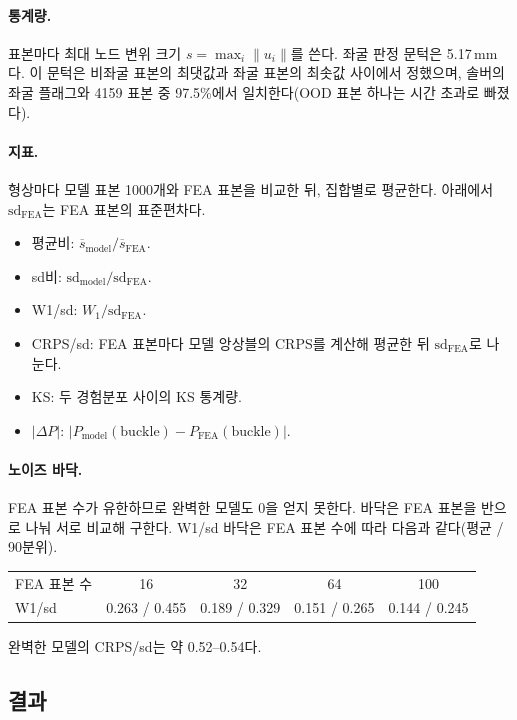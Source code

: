 \documentclass[11pt]{article}
\begin{document}
\paragraph{통계량.} 표본마다 최대 노드 변위 크기 $s=\max_i\|u_i\|$를 쓴다.
좌굴 판정 문턱은 5.17\,mm다. 이 문턱은 비좌굴 표본의 최댓값과 좌굴 표본의
최솟값 사이에서 정했으며, 솔버의 좌굴 플래그와 4159 표본 중 97.5\%에서
일치한다(OOD 표본 하나는 시간 초과로 빠졌다).

\paragraph{지표.} 형상마다 모델 표본 1000개와 FEA 표본을 비교한 뒤, 집합별로
평균한다. 아래에서 $\mathrm{sd}_{\text{FEA}}$는 FEA 표본의 표준편차다.
\begin{itemize}
\item 평균비: $\overline{s}_{\text{model}}/\overline{s}_{\text{FEA}}$.
\item sd비: $\mathrm{sd}_{\text{model}}/\mathrm{sd}_{\text{FEA}}$.
\item W1/sd: $W_1/\mathrm{sd}_{\text{FEA}}$.
\item CRPS/sd: FEA 표본마다 모델 앙상블의 CRPS를 계산해 평균한 뒤
  $\mathrm{sd}_{\text{FEA}}$로 나눈다.
\item KS: 두 경험분포 사이의 KS 통계량.
\item $|\Delta P|$: $|P_{\text{model}}(\text{buckle})-P_{\text{FEA}}(\text{buckle})|$.
\end{itemize}
\paragraph{노이즈 바닥.} FEA 표본 수가 유한하므로 완벽한 모델도 0을 얻지
못한다. 바닥은 FEA 표본을 반으로 나눠 서로 비교해 구한다. W1/sd 바닥은
FEA 표본 수에 따라 다음과 같다(평균 / 90분위).
\begin{center}
\begin{tabular}{@{}lcccc@{}}
\toprule
FEA 표본 수 & 16 & 32 & 64 & 100 \\
W1/sd & 0.263 / 0.455 & 0.189 / 0.329 & 0.151 / 0.265 & 0.144 / 0.245 \\
\bottomrule
\end{tabular}
\end{center}
완벽한 모델의 CRPS/sd는 약 0.52--0.54다.

\subsection{결과}\label{sec:results}
\end{document}
